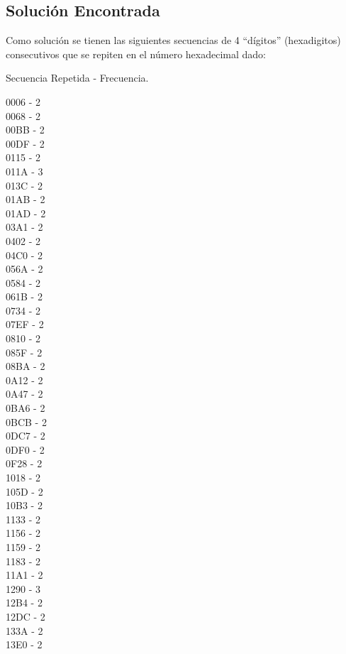 \documentclass[10pt,letterpaper]{article}
\begin{document}
\subsection{Solución Encontrada}

Como solución se tienen las siguientes secuencias de 4 “dígitos” (hexadigitos) consecutivos que se repiten en el número hexadecimal dado:

Secuencia Repetida - Frecuencia.

\begin{multicols}{5}
0006 -  2\\
0068 -  2\\
00BB -  2\\
00DF -  2\\
0115 -  2\\
011A -  3\\
013C -  2\\
01AB -  2\\
01AD -  2\\
03A1 -  2\\
0402 -  2\\
04C0 -  2\\
056A -  2\\
0584 -  2\\
061B -  2\\
0734 -  2\\
07EF -  2\\
0810 -  2\\
085F -  2\\
08BA -  2\\
0A12 -  2\\
0A47 -  2\\
0BA6 -  2\\
0BCB -  2\\
0DC7 -  2\\
0DF0 -  2\\
0F28 -  2\\
1018 -  2\\
105D -  2\\
10B3 -  2\\
1133 -  2\\
1156 -  2\\
1159 -  2\\
1183 -  2\\
11A1 -  2\\
1290 -  3\\
12B4 -  2\\
12DC -  2\\
133A -  2\\
13E0 -  2\\

\end{multicols}
\end{document}
